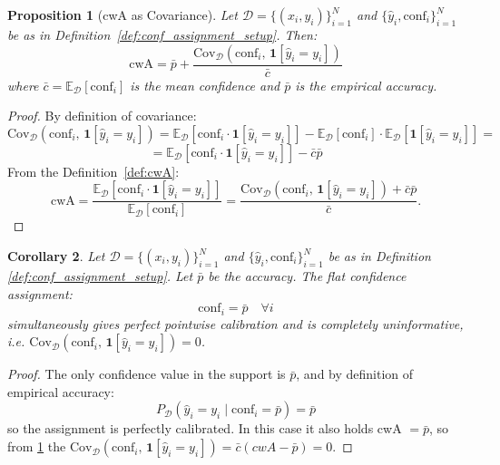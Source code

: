 \documentclass{article}
\theoremstyle{plain}
\newtheorem{theorem}{Proposition}
\newtheorem{corollary}[theorem]{Corollary}
\theoremstyle{definition}
\theoremstyle{remark}
\begin{document}
\begin{theorem}[cwA as Covariance] \label{prop:cwA_covariance}
Let $\mathcal{D} = \{(x_i, y_i)\}_{i=1}^N$ and $\{\hat{y}_i, \mathrm{conf}_i\}_{i=1}^N$ be as in 
Definition~\ref{def:conf_assignment_setup}. Then:
\[
    \mathrm{cwA} = \bar{p} +  \frac{\mathrm{Cov}_{\mathcal{D}}(\mathrm{conf}_i,\, \mathbf{1}[\hat{y}_i = y_i])}{\bar{c}}
\]
where $\bar{c} = \mathbb{E}_{\mathcal{D}}[\mathrm{conf}_i]$ is the mean confidence and $\bar{p}$ is the empirical accuracy.
\end{theorem}
\begin{proof}
By definition of covariance:
\[
    \mathrm{Cov}_{\mathcal{D}}(\mathrm{conf}_i,\, \mathbf{1}[\hat{y}_i = y_i]) 
    = \mathbb{E}_{\mathcal{D}}[\mathrm{conf}_i \cdot \mathbf{1}[\hat{y}_i = y_i]] - \mathbb{E}_{\mathcal{D}}[\mathrm{conf}_i] \cdot \mathbb{E}_{\mathcal{D}}[\mathbf{1}[\hat{y}_i = y_i]] = 
\]\[
	= \mathbb{E}_{\mathcal{D}}[\mathrm{conf}_i \cdot \mathbf{1}[\hat{y}_i = y_i]] - \bar{c} \bar{p}
\]
From the Definition~\ref{def:cwA}:
\[
    \mathrm{cwA} = \frac{\mathbb{E}_{\mathcal{D}}[\mathrm{conf}_i \cdot \mathbf{1}[\hat{y}_i = y_i]]}{\mathbb{E}_{\mathcal{D}}[\mathrm{conf}_i]} = \frac{\mathrm{Cov}_{\mathcal{D}}(\mathrm{conf}_i,\, \mathbf{1}[\hat{y}_i = y_i]) + \bar{c}\bar{p}}{\bar{c}}. 
\]
\end{proof}


\begin{corollary} \label{corollary:calibrated_yet_uselss}
Let $\mathcal{D} = \{(x_i, y_i)\}_{i=1}^N$ and $\{\hat{y}_i, \text{conf}_i\}_{i=1}^N$ be as in Definition \ref{def:conf_assignment_setup}. Let $\bar{p}$ be the accuracy. The flat confidence assignment: \[
\text{conf}_i = \bar{p} \quad \forall i \]
simultaneously gives perfect pointwise calibration and is completely uninformative, i.e. $\mathrm{Cov}_{\mathcal{D}}(\mathrm{conf}_i,\, \mathbf{1}[\hat{y}_i = y_i]) = 0$.
\end{corollary}
\begin{proof}
The only confidence value in the support is $\bar{p}$, and by definition of empirical accuracy: \[
P_{\mathcal{D}}(\hat{y}_i = y_i \mid \text{conf}_i = \bar{p}) = \bar{p} 
\] so the assignment is perfectly calibrated. In this case it also holds cwA $= \bar{p}$, so from \ref{prop:cwA_covariance} the $\mathrm{Cov}_{\mathcal{D}}(\mathrm{conf}_i,\, \mathbf{1}[\hat{y}_i = y_i]) = \bar{c}(cwA - \bar{p}) = 0$.
\end{proof}
\bigskip
\end{document}
